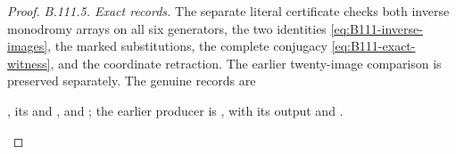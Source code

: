 \begin{proof}
\emph{B.111.5. Exact records.}
The separate literal certificate checks both inverse monodromy arrays
on all six generators, the two identities
\eqref{eq:B111-inverse-images}, the marked substitutions, the complete
conjugacy \eqref{eq:B111-exact-witness}, and the coordinate retraction.
The earlier twenty-image comparison is preserved separately.
The genuine records are
\begin{raggedright}\small
{},
its  and , and
;
the earlier producer is
, with its output and
.
\par\end{raggedright}
\end{proof}
